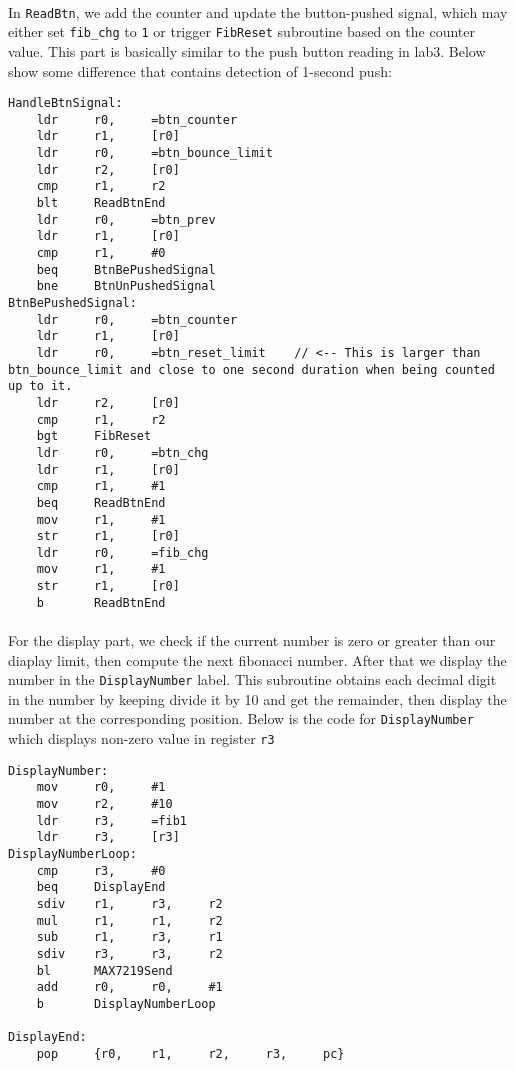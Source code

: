 \paragraph{}
In \texttt{ReadBtn}, we add the counter and update the button-pushed signal,
which may either set \texttt{fib\_chg} to \texttt{1} or trigger \texttt{FibReset} subroutine based on the counter value.
This part is basically similar to the push button reading in lab3. Below show some difference that contains detection of 1-second push:
\begin{lstlisting}
HandleBtnSignal:
    ldr     r0,     =btn_counter
    ldr     r1,     [r0]
    ldr     r0,     =btn_bounce_limit
    ldr     r2,     [r0]
    cmp     r1,     r2
    blt     ReadBtnEnd
    ldr     r0,     =btn_prev
    ldr     r1,     [r0]
    cmp     r1,     #0
    beq     BtnBePushedSignal
    bne     BtnUnPushedSignal
BtnBePushedSignal:
    ldr     r0,     =btn_counter
    ldr     r1,     [r0]
    ldr     r0,     =btn_reset_limit    // <-- This is larger than btn_bounce_limit and close to one second duration when being counted up to it.
    ldr     r2,     [r0]
    cmp     r1,     r2
    bgt     FibReset
    ldr     r0,     =btn_chg
    ldr     r1,     [r0]
    cmp     r1,     #1
    beq     ReadBtnEnd
    mov     r1,     #1
    str     r1,     [r0]
    ldr     r0,     =fib_chg
    mov     r1,     #1
    str     r1,     [r0]
    b       ReadBtnEnd
\end{lstlisting}
\paragraph{}
For the display part, we check if the current number is zero or greater than our diaplay limit, then compute the next fibonacci number.
After that we display the number in the \texttt{DisplayNumber} label.
This subroutine obtains each decimal digit in the number by keeping divide it by 10 and get the remainder,
then display the number at the corresponding position.
Below is the code for \texttt{DisplayNumber} which displays non-zero value in register \texttt{r3}
\begin{lstlisting}
DisplayNumber:
    mov     r0,     #1
    mov     r2,     #10
    ldr     r3,     =fib1
    ldr     r3,     [r3]
DisplayNumberLoop:
    cmp     r3,     #0
    beq     DisplayEnd
    sdiv    r1,     r3,     r2
    mul     r1,     r1,     r2
    sub     r1,     r3,     r1
    sdiv    r3,     r3,     r2
    bl      MAX7219Send
    add     r0,     r0,     #1
    b       DisplayNumberLoop
    
DisplayEnd:
    pop     {r0,    r1,     r2,     r3,     pc}
\end{lstlisting}
